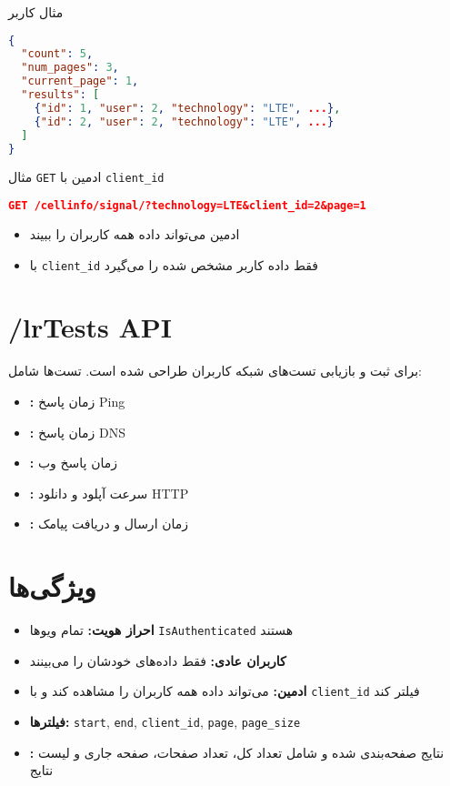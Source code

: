 \documentclass{report}
\begin{document}
مثال \texttt{} کاربر
\begin{lstlisting}[language=json]
{
  "count": 5,
  "num_pages": 3,
  "current_page": 1,
  "results": [
    {"id": 1, "user": 2, "technology": "LTE", ...},
    {"id": 2, "user": 2, "technology": "LTE", ...}
  ]
}
\end{lstlisting}

مثال \texttt{GET} ادمین با \texttt{client\_id}
\begin{lstlisting}[language=json]
GET /cellinfo/signal/?technology=LTE&client_id=2&page=1
\end{lstlisting}
\begin{itemize}
    \item ادمین می‌تواند داده همه کاربران را ببیند
    \item با \texttt{client\_id} فقط داده کاربر مشخص شده را می‌گیرد
\end{itemize}

\section{/lr{Tests API}}
 برای ثبت و بازیابی تست‌های شبکه کاربران طراحی شده است. تست‌ها شامل:
\begin{itemize}
    \item \textbf{:} زمان پاسخ Ping
    \item \textbf{:} زمان پاسخ DNS
    \item \textbf{:} زمان پاسخ وب
    \item \textbf{:} سرعت آپلود و دانلود HTTP
    \item \textbf{:} زمان ارسال و دریافت پیامک
\end{itemize}

\section{ویژگی‌ها}
\begin{itemize}
    \item \textbf{احراز هویت:} تمام ویوها \texttt{IsAuthenticated} هستند
    \item \textbf{کاربران عادی:} فقط داده‌های خودشان را می‌بینند
    \item \textbf{ادمین:} می‌تواند داده همه کاربران را مشاهده کند و با \texttt{client\_id} فیلتر کند
    \item \textbf{فیلترها:} \texttt{start}, \texttt{end}, \texttt{client\_id}, \texttt{page}, \texttt{page\_size}
    \item \textbf{:} نتایج صفحه‌بندی شده و شامل تعداد کل، تعداد صفحات، صفحه جاری و لیست نتایج
\end{itemize}
\end{document}
